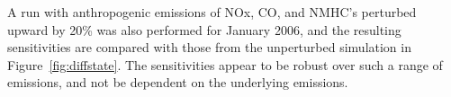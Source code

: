 A run with anthropogenic emissions of NOx, CO, and NMHC's perturbed upward by 20\% was also performed for January 2006, and the resulting sensitivities are compared with those from the unperturbed simulation in Figure~\ref{fig:diffstate}. The sensitivities appear to be robust over such a range of emissions, and not be dependent on the underlying emissions.